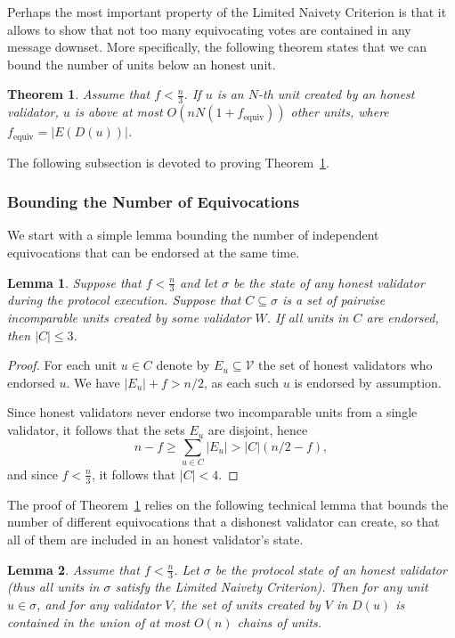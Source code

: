 \documentclass[12pt, fleqn]{article}
\newtheorem{theorem}{Theorem}
\newtheorem{lemma}{Lemma}
\newcommand{\cV}{\mathcal{V}}
\begin{document}
Perhaps the most important property of the Limited Naivety Criterion is that it allows to show that not too many equivocating votes are contained in any message downset.
%
More specifically, the following theorem states that we can bound the number of units below an honest unit.


\begin{theorem}\label{thm:limit_spam}
Assume that $f<\frac{n}{3}$. If $u$ is an $N$-th unit created by an honest validator, $u$ is above at most $O(n N(1 + f_{\mathrm{equiv}}))$ other units, where $f_{\mathrm{equiv}}=|E(D(u))|$.
\end{theorem}

\noindent 
The following subsection is devoted to proving Theorem~\ref{thm:limit_spam}.

\subsubsection{Bounding the Number of Equivocations}
We start with a simple lemma bounding the number of independent equivocations that can be endorsed at the same time.
\begin{lemma}\label{lem:limit_endors}
Suppose that $f<\frac{n}{3}$ and let $\sigma$ be the state of any honest validator during the protocol execution. %
Suppose that $C\subseteq \sigma $ is a set of pairwise incomparable units created by some validator $W$.
%
If all units in $C$ are endorsed, then $|C|\leq 3$. 
\end{lemma}
\begin{proof}
For each unit $u \in C$ denote by $E_u \subseteq \cV$ the set of honest validators who endorsed $u$.
%
We have $|E_u|+f >n/2$, as each such $u$ is endorsed by assumption.
%

Since honest validators never endorse two incomparable units from a single validator, it follows that the sets $E_u$ are disjoint, hence
$$n-f \geq \sum_{u\in C} |E_u| > |C|(n/2 - f),$$
and since $f<\frac{n}{3}$, it follows that $|C|<4$.
\end{proof}
The proof of Theorem~\ref{thm:limit_spam} relies on the following technical lemma that bounds the number of different equivocations that a dishonest validator can create, so that all of them are included in an honest validator's state.
\begin{lemma}\label{chainBoundLemma}
Assume that $f< \frac{n}{3}$.
%
Let $\sigma$ be the protocol state of an honest validator (thus all units in $\sigma$ satisfy the Limited Naivety Criterion). Then for any unit $u\in \sigma$, and for any validator $V$, the set of units created by $V$ in $D(u)$ is contained in the union of at most $O(n)$ chains of units.
\end{lemma}
\end{document}
